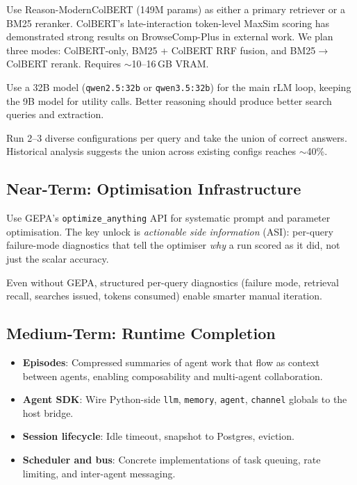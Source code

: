 \documentclass[11pt,a4paper]{article}
\begin{document}
\begin{description}[style=nextline, labelwidth=4.5cm, leftmargin=5cm]
  \item[ColBERT reranking (R2)] Use Reason-ModernColBERT (149M params) as
    either a primary retriever or a BM25 reranker. ColBERT's late-interaction
    token-level MaxSim scoring has demonstrated strong results on
    BrowseComp-Plus in external work. We plan three modes: ColBERT-only, BM25 +
    ColBERT RRF fusion, and BM25$\to$ColBERT rerank. Requires $\sim$10--16\,GB
    VRAM.
  \item[Larger rLM model (A3)] Use a 32B model (\texttt{qwen2.5:32b} or
    \texttt{qwen3.5:32b}) for the main rLM loop, keeping the 9B model for
    utility calls. Better reasoning should produce better search queries and
    extraction.
  \item[Ensemble (A4)] Run 2--3 diverse configurations per query and take the
    union of correct answers. Historical analysis suggests the union across
    existing configs reaches $\sim$40\%.
\end{description}

\subsection{Near-Term: Optimisation Infrastructure}

\begin{description}[style=nextline, labelwidth=4.5cm, leftmargin=5cm]
  \item[GEPA integration] Use GEPA's \texttt{optimize\_anything} API for
    systematic prompt and parameter optimisation. The key unlock is
    \emph{actionable side information} (ASI): per-query failure-mode
    diagnostics that tell the optimiser \emph{why} a run scored as it did, not
    just the scalar accuracy.
  \item[ASI infrastructure] Even without GEPA, structured per-query diagnostics
    (failure mode, retrieval recall, searches issued, tokens consumed) enable
    smarter manual iteration.
\end{description}

\subsection{Medium-Term: Runtime Completion}

\begin{itemize}[nosep]
  \item \textbf{Episodes}: Compressed summaries of agent work that flow as
        context between agents, enabling composability and multi-agent
        collaboration.
  \item \textbf{Agent SDK}: Wire Python-side \texttt{llm}, \texttt{memory},
        \texttt{agent}, \texttt{channel} globals to the host bridge.
  \item \textbf{Session lifecycle}: Idle timeout, snapshot to Postgres, eviction.
  \item \textbf{Scheduler and bus}: Concrete implementations of task queuing,
        rate limiting, and inter-agent messaging.
\end{itemize}
\end{document}
